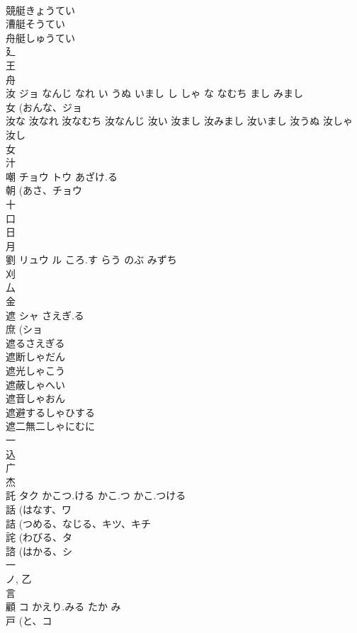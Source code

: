 \documentclass[8pt]{extreport}
\begin{document}
\begin{CJK}{UTF8}{min}
\\	競艇きょうてい 
\\	漕艇そうてい 
\\	舟艇しゅうてい 
\\	廴 
\\	王 
\\	舟 
\\	汝	ジョ	なんじ なれ い うぬ いまし し しゃ な なむち まし みまし	
\\	女 (おんな、ジョ 
\\	汝な 汝なれ 汝なむち 汝なんじ 汝い 汝まし 汝みまし 汝いまし 汝うぬ 汝しゃ 
\\	汝し 
\\	女 
\\	汁 
\\	嘲	チョウ トウ	あざけ.る	
\\	朝 (あさ、チョウ 
\\	十 
\\	口 
\\	日 
\\	月 
\\	劉	リュウ ル	ころ.す らう のぶ みずち	
\\	刈 
\\	厶 
\\	金 
\\	遮	シャ	さえぎ.る	
\\	庶 (ショ 
\\	遮るさえぎる 
\\	遮断しゃだん 
\\	遮光しゃこう 
\\	遮蔽しゃへい 
\\	遮音しゃおん 
\\	遮避するしゃひする 
\\	遮二無二しゃにむに 
\\	一 
\\	込 
\\	广 
\\	杰	
\\	託	タク	かこつ.ける かこ.つ かこ.つける	
\\	話 (はなす、ワ 
\\	詰 (つめる、なじる、キツ、キチ 
\\	詫 (わびる、タ 
\\	諮 (はかる、シ 
\\	一 
\\	ノ, 乙 
\\	言 
\\	顧	コ	かえり.みる たか み	
\\	戸 (と、コ 

\end{CJK}
\end{document}
